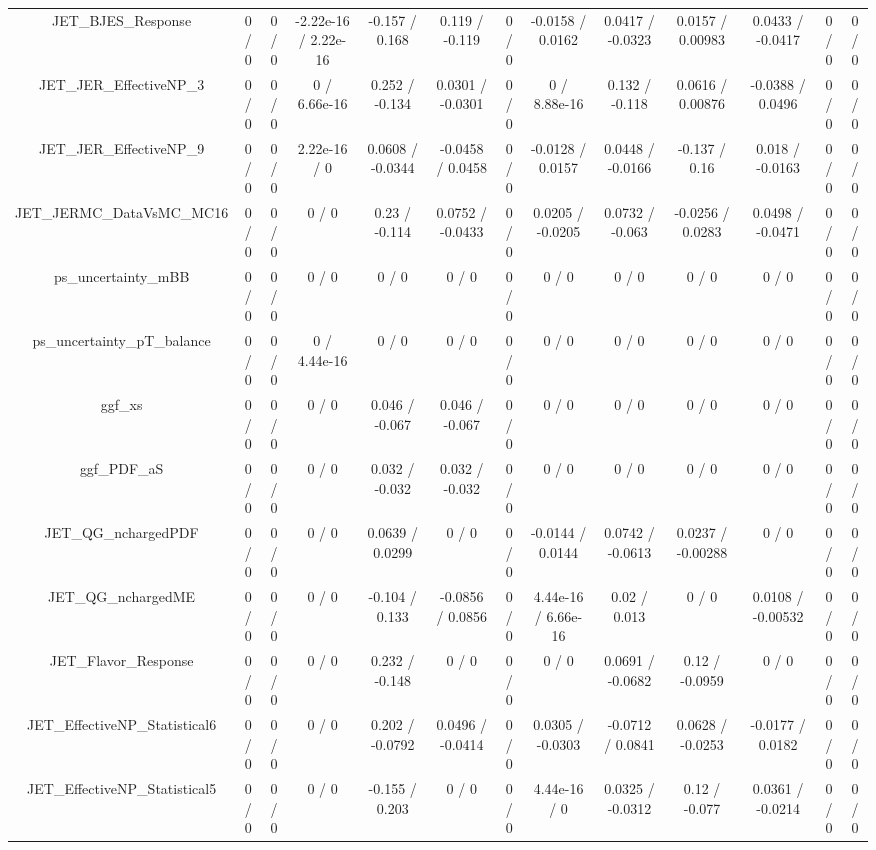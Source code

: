 \documentclass[10pt]{article}
\begin{document}
\begin{table}[htbp]
\begin{center}
\begin{tabular}{|c|c|c|c|c|c|c|c|c|c|c|c|c|}
  JET_BJES_Response & 0 / 0 & 0 / 0 & -2.22e-16 / 2.22e-16 & -0.157 / 0.168 & 0.119 / -0.119 & 0 / 0 & -0.0158 / 0.0162 & 0.0417 / -0.0323 & 0.0157 / 0.00983 & 0.0433 / -0.0417 & 0 / 0 & 0 / 0 \\ 
  JET_JER_EffectiveNP_3 & 0 / 0 & 0 / 0 & 0 / 6.66e-16 & 0.252 / -0.134 & 0.0301 / -0.0301 & 0 / 0 & 0 / 8.88e-16 & 0.132 / -0.118 & 0.0616 / 0.00876 & -0.0388 / 0.0496 & 0 / 0 & 0 / 0 \\ 
  JET_JER_EffectiveNP_9 & 0 / 0 & 0 / 0 & 2.22e-16 / 0 & 0.0608 / -0.0344 & -0.0458 / 0.0458 & 0 / 0 & -0.0128 / 0.0157 & 0.0448 / -0.0166 & -0.137 / 0.16 & 0.018 / -0.0163 & 0 / 0 & 0 / 0 \\ 
  JET_JERMC_DataVsMC_MC16 & 0 / 0 & 0 / 0 & 0 / 0 & 0.23 / -0.114 & 0.0752 / -0.0433 & 0 / 0 & 0.0205 / -0.0205 & 0.0732 / -0.063 & -0.0256 / 0.0283 & 0.0498 / -0.0471 & 0 / 0 & 0 / 0 \\ 
  ps_uncertainty_mBB & 0 / 0 & 0 / 0 & 0 / 0 & 0 / 0 & 0 / 0 & 0 / 0 & 0 / 0 & 0 / 0 & 0 / 0 & 0 / 0 & 0 / 0 & 0 / 0 \\ 
  ps_uncertainty_pT_balance & 0 / 0 & 0 / 0 & 0 / 4.44e-16 & 0 / 0 & 0 / 0 & 0 / 0 & 0 / 0 & 0 / 0 & 0 / 0 & 0 / 0 & 0 / 0 & 0 / 0 \\ 
  ggf_xs & 0 / 0 & 0 / 0 & 0 / 0 & 0.046 / -0.067 & 0.046 / -0.067 & 0 / 0 & 0 / 0 & 0 / 0 & 0 / 0 & 0 / 0 & 0 / 0 & 0 / 0 \\ 
  ggf_PDF_aS & 0 / 0 & 0 / 0 & 0 / 0 & 0.032 / -0.032 & 0.032 / -0.032 & 0 / 0 & 0 / 0 & 0 / 0 & 0 / 0 & 0 / 0 & 0 / 0 & 0 / 0 \\ 
  JET_QG_nchargedPDF & 0 / 0 & 0 / 0 & 0 / 0 & 0.0639 / 0.0299 & 0 / 0 & 0 / 0 & -0.0144 / 0.0144 & 0.0742 / -0.0613 & 0.0237 / -0.00288 & 0 / 0 & 0 / 0 & 0 / 0 \\ 
  JET_QG_nchargedME & 0 / 0 & 0 / 0 & 0 / 0 & -0.104 / 0.133 & -0.0856 / 0.0856 & 0 / 0 & 4.44e-16 / 6.66e-16 & 0.02 / 0.013 & 0 / 0 & 0.0108 / -0.00532 & 0 / 0 & 0 / 0 \\ 
  JET_Flavor_Response & 0 / 0 & 0 / 0 & 0 / 0 & 0.232 / -0.148 & 0 / 0 & 0 / 0 & 0 / 0 & 0.0691 / -0.0682 & 0.12 / -0.0959 & 0 / 0 & 0 / 0 & 0 / 0 \\ 
  JET_EffectiveNP_Statistical6 & 0 / 0 & 0 / 0 & 0 / 0 & 0.202 / -0.0792 & 0.0496 / -0.0414 & 0 / 0 & 0.0305 / -0.0303 & -0.0712 / 0.0841 & 0.0628 / -0.0253 & -0.0177 / 0.0182 & 0 / 0 & 0 / 0 \\ 
  JET_EffectiveNP_Statistical5 & 0 / 0 & 0 / 0 & 0 / 0 & -0.155 / 0.203 & 0 / 0 & 0 / 0 & 4.44e-16 / 0 & 0.0325 / -0.0312 & 0.12 / -0.077 & 0.0361 / -0.0214 & 0 / 0 & 0 / 0 \\ 

\end{tabular}
\end{center}
\end{table}
\end{document}
